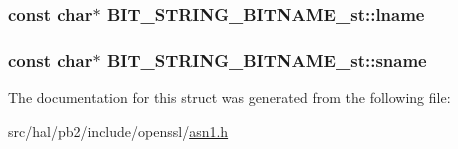 \subsubsection[{\texorpdfstring{lname}{lname}}]{\setlength{\rightskip}{0pt plus 5cm}const char$\ast$ B\+I\+T\+\_\+\+S\+T\+R\+I\+N\+G\+\_\+\+B\+I\+T\+N\+A\+M\+E\+\_\+st\+::lname}\hypertarget{struct_b_i_t___s_t_r_i_n_g___b_i_t_n_a_m_e__st_a7b6403eb8f9e092395526bd981150531}{}\label{struct_b_i_t___s_t_r_i_n_g___b_i_t_n_a_m_e__st_a7b6403eb8f9e092395526bd981150531}
\subsubsection[{\texorpdfstring{sname}{sname}}]{\setlength{\rightskip}{0pt plus 5cm}const char$\ast$ B\+I\+T\+\_\+\+S\+T\+R\+I\+N\+G\+\_\+\+B\+I\+T\+N\+A\+M\+E\+\_\+st\+::sname}\hypertarget{struct_b_i_t___s_t_r_i_n_g___b_i_t_n_a_m_e__st_a78a12a66f7da99aeb5e7a3b07cc411cf}{}\label{struct_b_i_t___s_t_r_i_n_g___b_i_t_n_a_m_e__st_a78a12a66f7da99aeb5e7a3b07cc411cf}


The documentation for this struct was generated from the following file\+:\begin{DoxyCompactItemize}
\item 
src/hal/pb2/include/openssl/\hyperlink{asn1_8h}{asn1.\+h}\end{DoxyCompactItemize}
